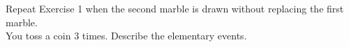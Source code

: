 \begin{ExerciseList}
 
 	\Exercise
 Repeat Exercise 1 when the second marble is drawn without replacing the first marble.\\
 	
     
	\Exercise
You toss a coin 3 times. Describe the elementary events.\\

\end{ExerciseList}



